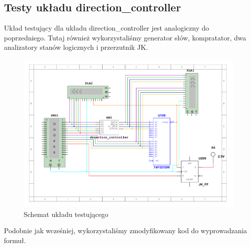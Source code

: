 \documentclass[a4paper]{article}
\begin{document}
\subsection{Testy układu direction\_controller}
Układ testujący dla układu direction\_controller jest analogiczny do poprzedniego.
Tutaj również wykorzystaliśmy generator słów, kompratator, dwa analizatory stanów logicznych
i przerzutnik JK. 

\begin{figure}[H]
    \centering
    \includegraphics[width=\textwidth]{component_test_direction_controller.pdf}
    \caption{Schemat układu testującego}
\end{figure}

Podobnie jak wcześniej, wykorzystaliśmy zmodyfikowany kod do wyprowadzania formuł.
\end{document}
